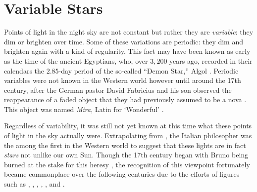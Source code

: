 \section{Variable Stars} 
\label{sec:history}

Points of light in the night sky are not constant but rather they are \emph{variable}: they dim or brighten over time. 
Some of these variations are periodic: they dim and brighten again with a kind of regularity. 
This fact may have been known as early as the time of the ancient Egyptians, who, over $3,200$ years ago, recorded in their calendars the $2.85$-day period of the so-called ``Demon Star,'' Algol \citep[e.g.,][]{jetsu2015shifting}. 
Periodic variables were not known in the Western world however until around the 17th century, after the German pastor David Fabricius and his son observed the reappearance of a faded object that they had previously assumed to be a nova \citep[e.g.,][]{2015pust.book.....C}. 
This object was named \emph{Mira}, Latin for `Wonderful' \citep{hevelius}. 

Regardless of variability, it was still not yet known at this time what these points of light in the sky actually were. 
Extrapolating from \citet{copernicus}, the Italian philosopher  %
was the among the first in the Western world to suggest that these lights are in fact \emph{stars} not unlike our own Sun. 
Though the 17th century began with Bruno being burned at the stake for this heresy \citep[e.g.,][]{bruno1998giordano}, the recognition of this viewpoint fortunately became commonplace over the following centuries due to the efforts of figures such as \citet{kepler}, , \citet{newton}, \citet{huygens}, \citet{1838AN.....16...65B}, and \citet{sacchi}. 

